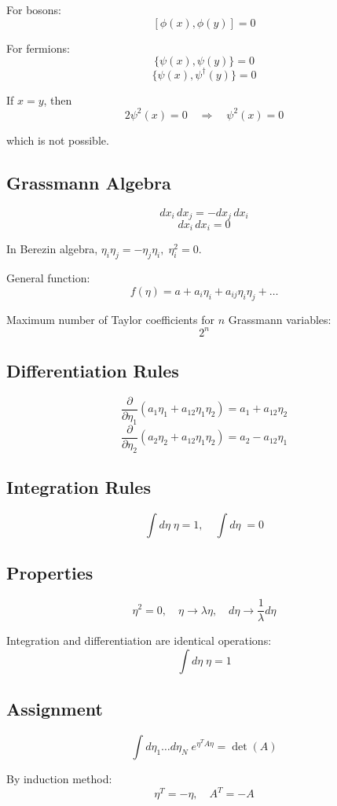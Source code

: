 \documentclass[14pt]{article} %
\begin{document}
For bosons:
\[
[\phi(x), \phi(y)] = 0
\]

For fermions:
\[
\{\psi(x), \psi(y)\} = 0
\]
\[
\{\psi(x), \psi^\dagger(y)\} = 0
\]

If $x=y$, then
\[
2\psi^2(x) = 0 \quad \Rightarrow \quad \psi^2(x)=0
\]

which is not possible.

\subsection{Grassmann Algebra}

\[
dx_i \, dx_j = - dx_j \, dx_i
\]
\[
dx_i \, dx_i = 0
\]

In Berezin algebra, $\eta_i \eta_j = - \eta_j \eta_i, \; \eta_i^2=0$.

General function:
\[
f(\eta) = a + a_i \eta_i + a_{ij} \eta_i \eta_j + \dots
\]

Maximum number of Taylor coefficients for $n$ Grassmann variables:
\[
2^n
\]

\subsection*{Differentiation Rules}
\[
\frac{\partial}{\partial \eta_1}(a_1 \eta_1 + a_{12} \eta_1 \eta_2) = a_1 + a_{12}\eta_2
\]
\[
\frac{\partial}{\partial \eta_2}(a_2 \eta_2 + a_{12} \eta_1 \eta_2) = a_2 - a_{12}\eta_1
\]

\subsection*{Integration Rules}
\[
\int d\eta \; \eta = 1, \quad \int d\eta \; = 0
\]

\subsection*{Properties}
\[
\eta^2 = 0, \quad \eta \to \lambda \eta, \quad d\eta \to \frac{1}{\lambda} d\eta
\]

Integration and differentiation are identical operations:
\[
\int d\eta \; \eta = 1
\]

\begin{tcolorbox}
\subsection*{Assignment}
\[
\int d\eta_1 \dots d\eta_N \; e^{\eta^T A \eta} = \det(A)
\]

By induction method:
\[
\eta^T = -\eta, \quad A^T = -A
\]
\end{tcolorbox}
\end{document}
